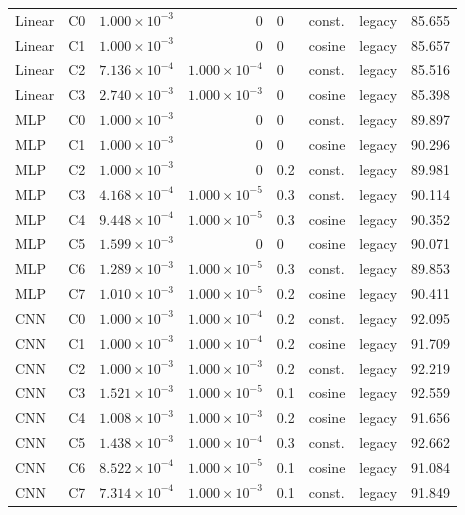 \begin{center}
\begin{longtable}{llrrlllr}
Linear & C0 & $1.000\!\times\!10^{-3}$ & $0$ & 0 & const. & legacy & 85.655 \\
Linear & C1 & $1.000\!\times\!10^{-3}$ & $0$ & 0 & cosine & legacy & 85.657 \\
Linear & C2 & $7.136\!\times\!10^{-4}$ & $1.000\!\times\!10^{-4}$ & 0 & const. & legacy & 85.516 \\
Linear & C3 & $2.740\!\times\!10^{-3}$ & $1.000\!\times\!10^{-3}$ & 0 & cosine & legacy & 85.398 \\
MLP & C0 & $1.000\!\times\!10^{-3}$ & $0$ & 0 & const. & legacy & 89.897 \\
MLP & C1 & $1.000\!\times\!10^{-3}$ & $0$ & 0 & cosine & legacy & 90.296 \\
MLP & C2 & $1.000\!\times\!10^{-3}$ & $0$ & 0.2 & const. & legacy & 89.981 \\
MLP & C3 & $4.168\!\times\!10^{-4}$ & $1.000\!\times\!10^{-5}$ & 0.3 & const. & legacy & 90.114 \\
MLP & C4 & $9.448\!\times\!10^{-4}$ & $1.000\!\times\!10^{-5}$ & 0.3 & cosine & legacy & 90.352 \\
MLP & C5 & $1.599\!\times\!10^{-3}$ & $0$ & 0 & cosine & legacy & 90.071 \\
MLP & C6 & $1.289\!\times\!10^{-3}$ & $1.000\!\times\!10^{-5}$ & 0.3 & const. & legacy & 89.853 \\
MLP & C7 & $1.010\!\times\!10^{-3}$ & $1.000\!\times\!10^{-5}$ & 0.2 & cosine & legacy & 90.411 \\
CNN & C0 & $1.000\!\times\!10^{-3}$ & $1.000\!\times\!10^{-4}$ & 0.2 & const. & legacy & 92.095 \\
CNN & C1 & $1.000\!\times\!10^{-3}$ & $1.000\!\times\!10^{-4}$ & 0.2 & cosine & legacy & 91.709 \\
CNN & C2 & $1.000\!\times\!10^{-3}$ & $1.000\!\times\!10^{-3}$ & 0.2 & const. & legacy & 92.219 \\
CNN & C3 & $1.521\!\times\!10^{-3}$ & $1.000\!\times\!10^{-5}$ & 0.1 & cosine & legacy & 92.559 \\
CNN & C4 & $1.008\!\times\!10^{-3}$ & $1.000\!\times\!10^{-3}$ & 0.2 & cosine & legacy & 91.656 \\
CNN & C5 & $1.438\!\times\!10^{-3}$ & $1.000\!\times\!10^{-4}$ & 0.3 & const. & legacy & 92.662 \\
CNN & C6 & $8.522\!\times\!10^{-4}$ & $1.000\!\times\!10^{-5}$ & 0.1 & cosine & legacy & 91.084 \\
CNN & C7 & $7.314\!\times\!10^{-4}$ & $1.000\!\times\!10^{-3}$ & 0.1 & const. & legacy & 91.849 \\

\end{longtable}
\end{center}
